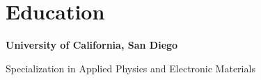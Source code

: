\section{Education}

{\bf University of California, San Diego}
    \par\hspace*{10pt} Specialization in Applied Physics and Electronic Materials

